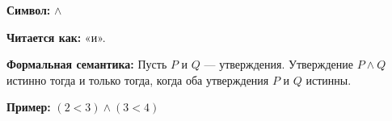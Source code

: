 
\hypertarget{def-conjunction}{}
\begin{definition} %

\textbf{Символ:} $\land$

\textbf{Читается как:} «и».

\textbf{Формальная семантика:}
Пусть $P$ и $Q$ — утверждения. Утверждение $P \land Q$ истинно тогда и только тогда, когда оба утверждения $P$ и $Q$ истинны.

\textbf{Пример:} $(2 < 3) \land (3 < 4)$
\end{definition}